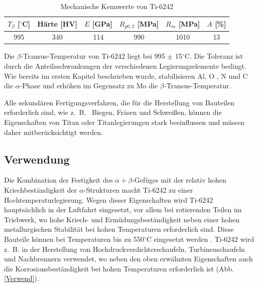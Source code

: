 \begin{table}[h]
	\centering	
	\begin{tabular}{|c| c| c| c| c| c|}										
		\hline
		$T_{\beta}$ [$^\circ$C]& Härte [HV] & $E$ [GPa]& $R_{p0,2}$ [MPa]& $R_m$ [MPa]& $A$ [\%] \\
		\hline
		995&340&114&990&1010&13\\
		\hline
	\end{tabular}
	\caption{Mechanische Kennwerte von Ti-6242 \cite{C.Leyens.2005}}
	\label{Mec.}
\end{table}

Die $\beta$-Transus-Temperatur von Ti-6242 liegt bei 995 $\pm$ 15$^\circ$C. Die Toleranz ist durch die Anteilsschwankungen der verschiedenen Legierungselemente bedingt. Wie bereits im ersten Kapitel beschrieben wurde, stabilisieren  Al, O , N und C die $\alpha$-Phase und erhöhen im Gegensatz zu Mo die $\beta$-Transus-Temperatur.

Alle sekundären Fertigungsverfahren, die für die Herstellung von Bauteilen erforderlich sind, wie z.~B.~ Biegen, Fräsen und Schweißen, können die  Eigenschaften von Titan oder Titanlegierungen stark beeinflussen und müssen daher mitberücksichtigt werden.


\subsection{Verwendung}


Die Kombination der Festigkeit des $\alpha+\beta$-Gefüges mit der relativ hohen Kriechbeständigkeit der $\alpha$-Strukturen macht Ti-6242 zu einer Hochtemperaturlegierung. 
Wegen dieser Eigenschaften wird Ti-6242 hauptsächlich in der Luftfahrt eingesetzt, vor allem bei rotierenden Teilen im Triebwerk, wo hohe Kriech- und Ermüdungsbeständigkeit neben einer hohen metallurgischen Stabilität bei hohen Temperaturen erforderlich sind. 
Diese Bauteile können bei Temperaturen bis zu 550$^\circ$C eingesetzt werden \cite{C.Leyens.2005}.
Ti-6242 wird z.~B. in der Herstellung von Hochdruckverdichterschaufeln, Turbinenschaufeln und Nachbrennern verwendet, wo neben den oben erwähnten Eigenschaften auch die Korrosionsbeständigkeit bei hohen Temperaturen erforderlich ist (Abb. \ref{Verwend}). 

